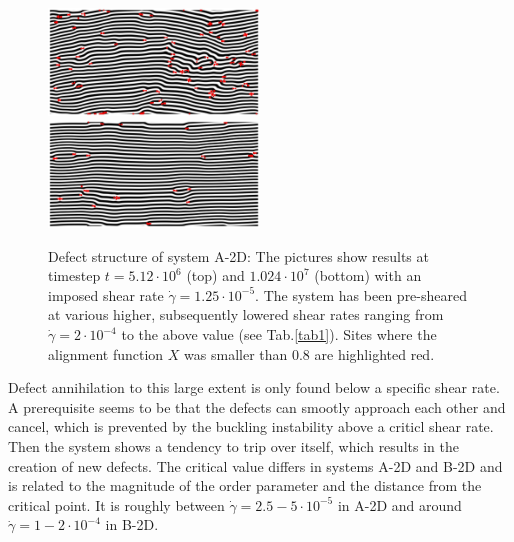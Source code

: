 \documentclass[8.5pt,twoside,twocolumn]{article}
\newcommand{\e}[1]{\cdot10^{#1}}
\begin{document}
\begin{figure}[htp]
\centering
\includegraphics[angle=0,width=0.5\textwidth]{phi_defects_run774_5120.jpg}
\includegraphics[angle=0,width=0.5\textwidth]{phi_defects_run774_10240.jpg}
\caption{Defect structure of system A-2D: The pictures show results at timestep $t=5.12\e{6}$ (top) and $1.024\e{7}$ (bottom) with an imposed shear rate $\dot{\gamma}=1.25\cdot10^{-5}$. The system has been pre-sheared at various higher, subsequently lowered shear rates ranging from $\dot{\gamma}=2\e{-4}$ to the above value (see Tab.\ref{tab1}). Sites where the alignment function $X$ was smaller than $0.8$ are highlighted red.}
\label{fig3}
\end{figure}

Defect annihilation to this large extent is only found below a specific shear rate.
A prerequisite seems to be that the defects can smootly approach each other and cancel, which is prevented by the buckling instability above a criticl shear rate.
Then the system shows a tendency to trip over itself, which results in the creation of new defects.
The critical value differs in systems A-2D and B-2D and is related to the magnitude of the order parameter and the distance from the critical point.
It is roughly between $\dot{\gamma}=2.5-5\e{-5}$ in A-2D and around $\dot{\gamma}=1-2\e{-4}$ in B-2D.\\
\end{document}
